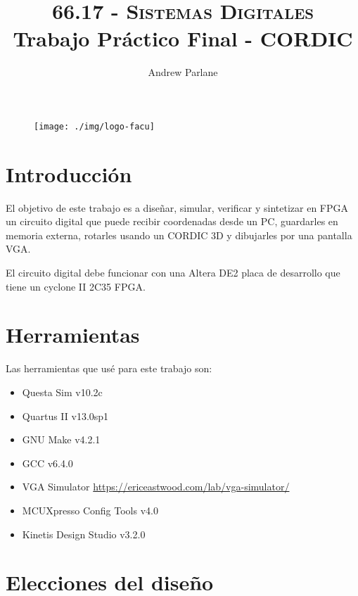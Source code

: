 \documentclass[a4paper]{article}
\begin{document}
\begin{figure}
\centering
\texttt{[image: ./img/logo-facu]}
\end{figure}

\title{\large\textsc{66.17 - Sistemas Digitales}\\
\large Trabajo Práctico Final - CORDIC}

\author{
Andrew Parlane \\
}

\maketitle

\newpage

\tableofcontents

\listoffigures

\newpage

\section{Introducción}

El objetivo de este trabajo es a diseñar, simular, verificar y sintetizar en FPGA un circuito digital que puede recibir coordenadas desde un PC, guardarles en memoria externa, rotarles usando un CORDIC 3D y dibujarles por una pantalla VGA.

El circuito digital debe funcionar con una Altera DE2 placa de desarrollo que tiene un cyclone II 2C35 FPGA.

\section{Herramientas}

Las herramientas que usé para este trabajo son:
\begin{itemize}[noitemsep]
\item Questa Sim v10.2c
\item Quartus II v13.0sp1
\item GNU Make v4.2.1
\item GCC v6.4.0
\item VGA Simulator \url{https://ericeastwood.com/lab/vga-simulator/}
\item MCUXpresso Config Tools v4.0
\item Kinetis Design Studio v3.2.0
\end{itemize}

\section{Elecciones del diseño}
\end{document}
